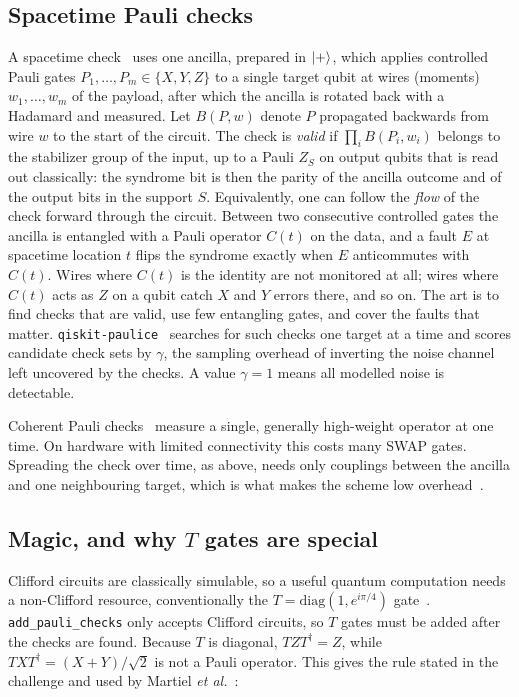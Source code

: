 \subsection{Spacetime Pauli checks}
A spacetime check~\cite{martiel2025spacetime} uses one ancilla, prepared in $\ket{+}$, which applies controlled Pauli gates $P_1,\dots,P_m\in\{X,Y,Z\}$ to a single target qubit at wires (moments) $w_1,\dots,w_m$ of the payload, after which the ancilla is rotated back with a Hadamard and measured. Let $B(P,w)$ denote $P$ propagated backwards from wire $w$ to the start of the circuit. The check is \emph{valid} if $\prod_iB(P_i,w_i)$ belongs to the stabilizer group of the input, up to a Pauli $Z_S$ on output qubits that is read out classically: the syndrome bit is then the parity of the ancilla outcome and of the output bits in the support $S$. Equivalently, one can follow the \emph{flow} of the check forward through the circuit. Between two consecutive controlled gates the ancilla is entangled with a Pauli operator $C(t)$ on the data, and a fault $E$ at spacetime location $t$ flips the syndrome exactly when $E$ anticommutes with $C(t)$. Wires where $C(t)$ is the identity are not monitored at all; wires where $C(t)$ acts as $Z$ on a qubit catch $X$ and $Y$ errors there, and so on. The art is to find checks that are valid, use few entangling gates, and cover the faults that matter. \texttt{qiskit-paulice}~\cite{paulice} searches for such checks one target at a time and scores candidate check sets by $\gamma$, the sampling overhead of inverting the noise channel left uncovered by the checks. A value $\gamma=1$ means all modelled noise is detectable.

Coherent Pauli checks~\cite{vandenberg2023cpc} measure a single, generally high-weight operator at one time. On hardware with limited connectivity this costs many SWAP gates. Spreading the check over time, as above, needs only couplings between the ancilla and one neighbouring target, which is what makes the scheme low overhead~\cite{martiel2025spacetime,ibm_tutorial_spacetime}.

\subsection{Magic, and why $T$ gates are special}
Clifford circuits are classically simulable, so a useful quantum computation needs a non-Clifford resource, conventionally the $T=\mathrm{diag}(1,e^{i\pi/4})$ gate~\cite{bravyi2005magic}. \texttt{add\_pauli\_checks} only accepts Clifford circuits, so $T$ gates must be added after the checks are found. Because $T$ is diagonal, $TZT^\dagger=Z$, while $TXT^\dagger=(X+Y)/\sqrt2$ is not a Pauli operator. This gives the rule stated in the challenge and used by Martiel \emph{et al.}~\cite{martiel2026sampling}:

